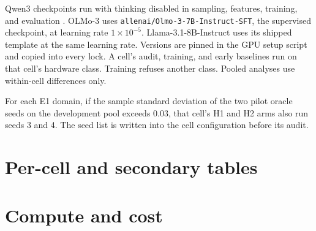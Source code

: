 Qwen3 checkpoints run with thinking disabled in sampling, features, training, and evaluation \citep{qwen2025qwen3}.
OLMo-3 uses \texttt{allenai/Olmo-3-7B-Instruct-SFT}, the supervised checkpoint, at learning rate $1 \times 10^{-5}$.
Llama-3.1-8B-Instruct uses its shipped template at the same learning rate.
Versions are pinned in the GPU setup script and copied into every lock.
A cell's audit, training, and early baselines run on that cell's hardware class.
Training refuses another class.
Pooled analyses use within-cell differences only.

For each E1 domain, if the sample standard deviation of the two pilot oracle seeds on the development pool exceeds 0.03, that cell's H1 and H2 arms also run seeds 3 and 4.
The seed list is written into the cell configuration before its audit.

\section{Per-cell and secondary tables}
\label{app:cells}

\begin{table}[t]
\caption{Confirmatory cells. Oracle gain and the conclusive bit stay pending until the stage report publishes them.}
\label{tab:cells}
\centering
\small
\setlength{\tabcolsep}{3pt}

\end{table}

\begin{table}[t]
\caption{Matched pairs from the report. Class is $-1$ for a shared-behaviour rule and $0$ otherwise.}
\label{tab:pairs}
\centering
\small
\setlength{\tabcolsep}{3pt}

\end{table}

\begin{table}[t]
\caption{Stage A label budget. Medians are pending until the stored draws are in the report.}
\label{tab:h9}
\centering
\small

\end{table}

\begin{table}[t]
\caption{Scale slopes of kit contrasts on $\log_{10}$ of the specification's parameter count. Pending until the union secondary is complete.}
\label{tab:scale}
\centering
\small

\end{table}

\section{Compute and cost}
\label{app:compute}

